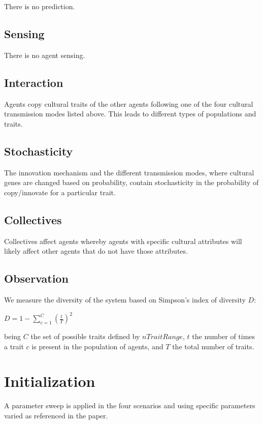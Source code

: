 \documentclass[11pt,a4paper,twocolumn,notitlepage]{article}
\begin{document}
There is no prediction.

\subsection{Sensing}

There is no agent sensing.

\subsection{Interaction}

Agents copy cultural traits of the other agents following one of the four cultural transmission modes listed above. This leads to different types of populations and traits. 

\subsection{Stochasticity}

The innovation mechanism and the different transmission modes, where cultural genes are changed based on probability, contain stochasticity in the probability of copy/innovate for a particular trait. 

\subsection{Collectives}

Collectives affect agents whereby agents with specific cultural attributes will likely affect other agents that do not have those attributes.

\subsection{Observation}

We measure the diversity of the system based on Simpson's index of diversity $D$:

$D = 1 - \sum\limits_{c=1}^C{(\frac{t}{T})^2}$

being $C$ the set of possible traits defined by $nTraitRange$, $t$ the number of times a trait $c$ is present in the population of agents, and $T$ the total number of traits.

\section{Initialization}

A parameter sweep is applied in the four scenarios and using specific parameters varied as referenced in the paper.
\end{document}
